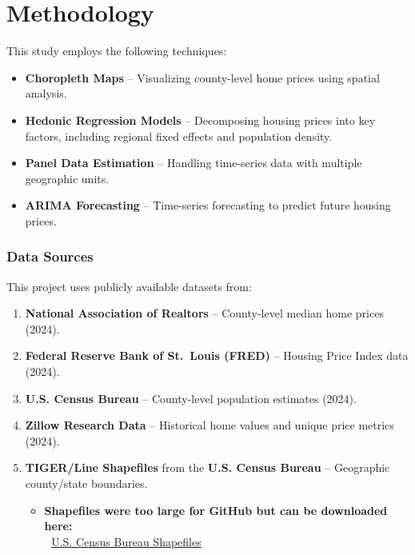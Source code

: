 \documentclass[
]{article}
\providecommand{\tightlist}{%
  \setlength{\itemsep}{0pt}\setlength{\parskip}{0pt}}
\begin{document}
\section{\texorpdfstring{\textbf{Methodology}}{Methodology}}\label{methodology}

This study employs the following techniques:

\begin{itemize}
\tightlist
\item
  \textbf{Choropleth Maps} -- Visualizing county-level home prices using
  spatial analysis.
\item
  \textbf{Hedonic Regression Models} -- Decomposing housing prices into
  key factors, including regional fixed effects and population density.
\item
  \textbf{Panel Data Estimation} -- Handling time-series data with
  multiple geographic units.
\item
  \textbf{ARIMA Forecasting} -- Time-series forecasting to predict
  future housing prices.
\end{itemize}

\subsubsection{\texorpdfstring{\textbf{Data
Sources}}{Data Sources}}\label{data-sources}

This project uses publicly available datasets from:

\begin{enumerate}
\def\labelenumi{\arabic{enumi}.}
\tightlist
\item
  \textbf{National Association of Realtors} -- County-level median home
  prices (2024).
\item
  \textbf{Federal Reserve Bank of St.~Louis (FRED)} -- Housing Price
  Index data (2024).
\item
  \textbf{U.S. Census Bureau} -- County-level population estimates
  (2024).
\item
  \textbf{Zillow Research Data} -- Historical home values and unique
  price metrics (2024).
\item
  \textbf{TIGER/Line Shapefiles} from the \textbf{U.S. Census Bureau} --
  Geographic county/state boundaries.

  \begin{itemize}
  \tightlist
  \item
    \textbf{Shapefiles were too large for GitHub but can be downloaded
    here:}\\
    🔗 \href{https://www2.census.gov/geo/tiger/TIGER2024/}{U.S. Census
    Bureau Shapefiles}
  \end{itemize}
\end{enumerate}
\end{document}
